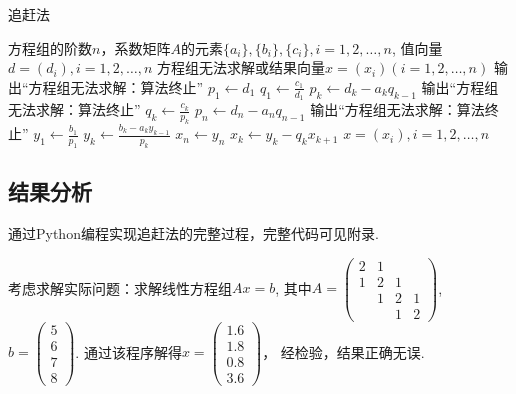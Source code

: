 \documentclass[UTF8,ctexart,a4paper,11pt,openany]{article}
\theoremstyle{definition}
\newcommand\e{\leftarrow}
\begin{document}
    \begin{algorithm}[H]
        \caption{追赶法}
        \begin{algorithmic}[1] %
            \Require 方程组的阶数$n$，系数矩阵$A$的元素$\{a_i\},\{b_i\},\{c_i\},i=1,2,\dots,n$, 值向量$d=(d_i),i=1,2,\dots,n$
            \Ensure 方程组无法求解或结果向量$x=(x_i)(i=1,2,\dots,n)$
                    \State 输出“方程组无法求解：算法终止”
                \EndIf
                \State $p_1\e d_1$
                \State $q_1\e \frac{c_1}{d_1}$
                    \State $p_k\e d_k-a_kq_{k-1}$
                        \State 输出“方程组无法求解：算法终止”
                    \EndIf 
                    \State $q_k\e \frac{c_k}{p_k}$
                \EndFor
                \State $p_n\e d_n-a_nq_{n-1}$
                    \State 输出“方程组无法求解：算法终止”
                \EndIf
                \State $y_1\e \frac{b_1}{p_1}$ 
                    \State $y_k\e \frac{b_k-a_ky_{k-1}}{p_k}$                    
                \EndFor
                \State $x_n\e y_n$
                    \State $x_k\e y_k-q_kx_{k+1}$
                \EndFor 
                \State \Return $x=(x_i),i=1,2,\dots,n$
            \EndFunction
        \end{algorithmic}
    \end{algorithm}
    \subsection{结果分析}
    通过Python编程实现追赶法的完整过程，完整代码可见附录. \par
    考虑求解实际问题：求解线性方程组$Ax=b$, 其中$A=\left(\begin{array}{cccc}2 & 1 & & \\ 1 & 2 & 1 & \\ & 1 & 2 & 1 \\ & & 1 & 2\end{array}\right)$, $b=\left(\begin{array}{cccc}5 \\ 6 \\ 7 \\ 8\end{array}\right)$. 通过该程序解得$x=\left(\begin{array}{cccc}1.6 \\ 1.8 \\ 0.8 \\ 3.6\end{array}\right)$， 经检验，结果正确无误.
\end{document}
